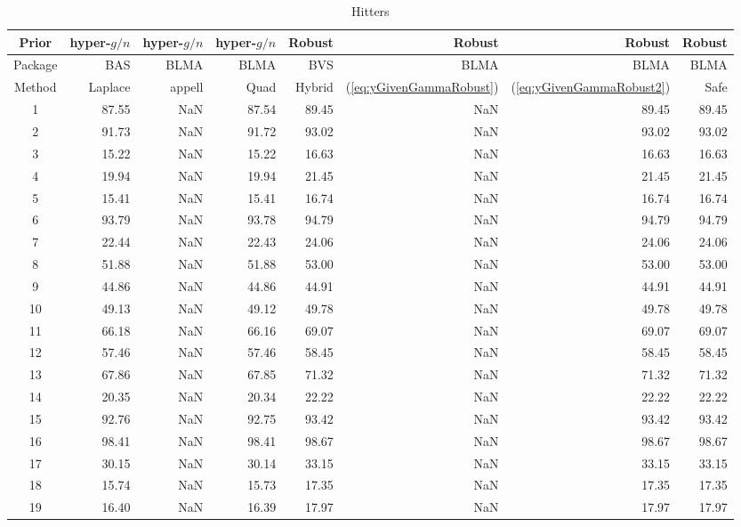 \begin{table}[ht]
	\centering
	{\small 
	\begin{tabular}{c|rrr|rrrr}
		Prior   & hyper-$g/n$ & hyper-$g/n$ & hyper-$g/n$ & Robust &  Robust & Robust & Robust \\		
		\hline
		Package & BAS         & BLMA        & BLMA        & BVS & BLMA & BLMA & BLMA  \\
		\hline 
		Method  & Laplace     & appell      & Quad  & Hybrid & (\ref{eq:yGivenGammaRobust}) & (\ref{eq:yGivenGammaRobust2}) & Safe \\ 
		\hline
		1 & 87.55 & NaN & 87.54 & 89.45 & NaN & 89.45 & 89.45 \\ 
		2 & 91.73 & NaN & 91.72 & 93.02 & NaN & 93.02 & 93.02 \\ 
		3 & 15.22 & NaN & 15.22 & 16.63 & NaN & 16.63 & 16.63 \\ 
		4 & 19.94 & NaN & 19.94 & 21.45 & NaN & 21.45 & 21.45 \\ 
		5 & 15.41 & NaN & 15.41 & 16.74 & NaN & 16.74 & 16.74 \\ 
		6 & 93.79 & NaN & 93.78 & 94.79 & NaN & 94.79 & 94.79 \\ 
		7 & 22.44 & NaN & 22.43 & 24.06 & NaN & 24.06 & 24.06 \\ 
		8 & 51.88 & NaN & 51.88 & 53.00 & NaN & 53.00 & 53.00 \\ 
		9 & 44.86 & NaN & 44.86 & 44.91 & NaN & 44.91 & 44.91 \\ 
		10 & 49.13 & NaN & 49.12 & 49.78 & NaN & 49.78 & 49.78 \\ 
		11 & 66.18 & NaN & 66.16 & 69.07 & NaN & 69.07 & 69.07 \\ 
		12 & 57.46 & NaN & 57.46 & 58.45 & NaN & 58.45 & 58.45 \\ 
		13 & 67.86 & NaN & 67.85 & 71.32 & NaN & 71.32 & 71.32 \\ 
		14 & 20.35 & NaN & 20.34 & 22.22 & NaN & 22.22 & 22.22 \\ 
		15 & 92.76 & NaN & 92.75 & 93.42 & NaN & 93.42 & 93.42 \\ 
		16 & 98.41 & NaN & 98.41 & 98.67 & NaN & 98.67 & 98.67 \\ 
		17 & 30.15 & NaN & 30.14 & 33.15 & NaN & 33.15 & 33.15 \\ 
		18 & 15.74 & NaN & 15.73 & 17.35 & NaN & 17.35 & 17.35 \\ 
		19 & 16.40 & NaN & 16.39 & 17.97 & NaN & 17.97 & 17.97 \\ 
		\hline
	\end{tabular}
}
	\caption{Hitters}
	\label{tab:HittersResults2}
\end{table}



